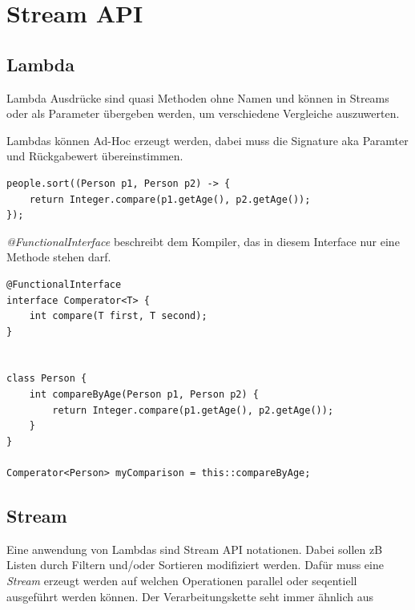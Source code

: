 \section{Stream API}
\subsection{Lambda}
Lambda Ausdrücke sind quasi Methoden ohne Namen und können in Streams oder als Parameter übergeben werden, um verschiedene Vergleiche auszuwerten.


Lambdas können Ad-Hoc erzeugt werden, dabei muss die Signature aka Paramter und Rückgabewert übereinstimmen.
\begin{lstlisting}
people.sort((Person p1, Person p2) -> {
	return Integer.compare(p1.getAge(), p2.getAge());	
});
\end{lstlisting}

\textit{@FunctionalInterface} beschreibt dem Kompiler, das in diesem Interface nur eine Methode stehen darf.
\begin{lstlisting}
@FunctionalInterface
interface Comperator<T> {
	int compare(T first, T second);
}


class Person {
	int compareByAge(Person p1, Person p2) {
		return Integer.compare(p1.getAge(), p2.getAge());	
	}
}

Comperator<Person> myComparison = this::compareByAge;
\end{lstlisting}

\subsection{Stream}
Eine anwendung von Lambdas sind Stream API notationen. Dabei sollen zB Listen durch Filtern und/oder Sortieren modifiziert werden. Dafür muss eine \textit{Stream} erzeugt werden auf welchen Operationen parallel oder seqentiell ausgeführt werden können. Der Verarbeitungskette seht immer ähnlich aus

